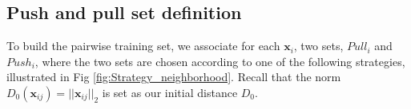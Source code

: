 
\subsection{Push and pull set definition}
To build the pairwise training set, we associate for each $\textbf{x}_i$, two sets, $Pull_i$ and $Push_i$, where the two sets are chosen according to one of the following strategies, illustrated in Fig \ref{fig:Strategy_neighborhood}. Recall that the norm $D_0(\textbf{x}_{ij}) = ||\textbf{x}_{ij}||_2$ is set as our initial distance $D_0$.
